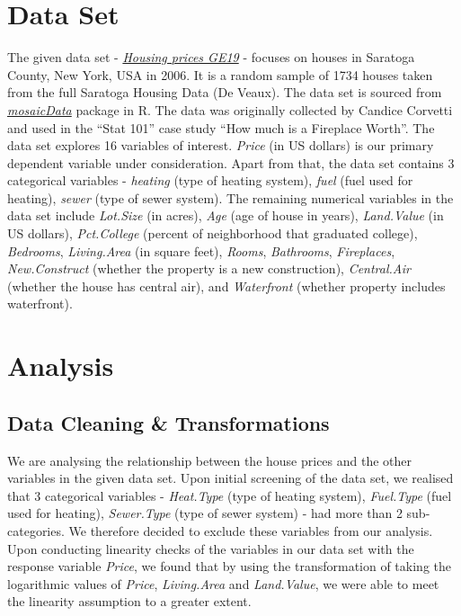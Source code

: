 \documentclass[letterpaper,9pt,twocolumn,twoside,]{pinp}
\begin{document}
\hypertarget{data-set}{%
\section{Data Set}\label{data-set}}

The given data set -
\href{https://dasl.datadescription.com/datafile/housing-prices-ge19}{\emph{Housing
prices GE19}} - focuses on houses in Saratoga County, New York, USA in
2006. It is a random sample of 1734 houses taken from the full Saratoga
Housing Data (De Veaux). The data set is sourced from
\href{https://rdrr.io/cran/mosaicData/}{\emph{mosaicData}} package in R.
The data was originally collected by Candice Corvetti and used in the
``Stat 101'' case study ``How much is a Fireplace Worth''. The data set
explores 16 variables of interest. \emph{Price} (in US dollars) is our
primary dependent variable under consideration. Apart from that, the
data set contains 3 categorical variables - \emph{heating} (type of
heating system), \emph{fuel} (fuel used for heating), \emph{sewer} (type
of sewer system). The remaining numerical variables in the data set
include \emph{Lot.Size} (in acres), \emph{Age} (age of house in years),
\emph{Land.Value} (in US dollars), \emph{Pct.College} (percent of
neighborhood that graduated college), \emph{Bedrooms},
\emph{Living.Area} (in square feet), \emph{Rooms}, \emph{Bathrooms},
\emph{Fireplaces}, \emph{New.Construct} (whether the property is a new
construction), \emph{Central.Air} (whether the house has central air),
and \emph{Waterfront} (whether property includes waterfront).

\hypertarget{analysis}{%
\section{Analysis}\label{analysis}}

\hypertarget{data-cleaning-transformations}{%
\subsection{Data Cleaning \&
Transformations}\label{data-cleaning-transformations}}

We are analysing the relationship between the house prices and the other
variables in the given data set. Upon initial screening of the data set,
we realised that 3 categorical variables - \emph{Heat.Type} (type of
heating system), \emph{Fuel.Type} (fuel used for heating),
\emph{Sewer.Type} (type of sewer system) - had more than 2
sub-categories. We therefore decided to exclude these variables from our
analysis. Upon conducting linearity checks of the variables in our data
set with the response variable \emph{Price}, we found that by using the
transformation of taking the logarithmic values of \emph{Price},
\emph{Living.Area} and \emph{Land.Value}, we were able to meet the
linearity assumption to a greater extent.
\end{document}
